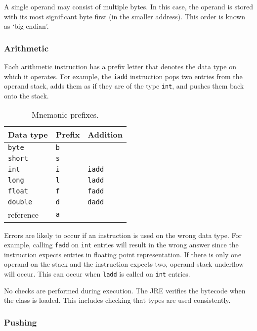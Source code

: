 A single operand may consist of multiple bytes.
In this case, the operand is stored with its most significant byte first (in the smaller address).
This order is known as `big endian'.

\subsubsection{Arithmetic}

Each arithmetic instruction has a prefix letter that denotes the data type on which it operates.
For example, the \texttt{iadd} instruction pops two entries from the operand stack, adds them as if they are of the type \texttt{int}, and pushes them back onto the stack.

\begin{table}[htp]
  \centering
  \caption*{Mnemonic prefixes.}
  \begin{tabular}{lll}
    \toprule
    Data type & Prefix & Addition \\
    \midrule
    \texttt{byte}   & \texttt{b} & \\
    \texttt{short}  & \texttt{s} & \\
    \texttt{int}    & \texttt{i} & \texttt{iadd} \\
    \texttt{long}   & \texttt{l} & \texttt{ladd} \\
    \texttt{float}  & \texttt{f} & \texttt{fadd} \\
    \texttt{double} & \texttt{d} & \texttt{dadd} \\
    reference       & \texttt{a} & \\
    \bottomrule
  \end{tabular}
\end{table}

Errors are likely to occur if an instruction is used on the wrong data type.
For example, calling \texttt{fadd} on \texttt{int} entries will result in the wrong answer since the instruction expects entries in floating point representation.
If there is only one operand on the stack and the instruction expects two, operand stack underflow will occur.
This can occur when \texttt{ladd} is called on \texttt{int} entries.

No checks are performed during execution.
The JRE verifies the bytecode when the class is loaded.
This includes checking that types are used consistently.

\subsubsection{Pushing}

